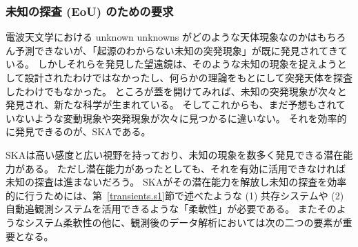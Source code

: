 \subsubsection{未知の探査 (EoU) のための要求}
電波天文学における unknown unknowns がどのような天体現象なのかはもちろん予測できないが、「起源のわからない未知の突発現象」が既に発見されてきている。
しかしそれらを発見した望遠鏡は、そのような未知の現象を捉えようとして設計されたわけではなかったし、何らかの理論をもとにして突発天体を探査したわけでもなかった。
ところが蓋を開けてみれば、未知の突発現象が次々と発見され、新たな科学が生まれている。
そしてこれからも、まだ予想もされていないような変動現象や突発現象が次々に見つかるに違いない。
それを効率的に発見できるのが、SKAである。

SKAは高い感度と広い視野を持っており、未知の現象を数多く発見できる潜在能力がある。
ただし潜在能力があったとしても、それを有効に活用できなければ未知の探査は進まないだろう。
SKAがその潜在能力を解放し未知の探査を効率的に行うためには、第~\ref{transients.s1}節で述べたような (1) 共存システムや (2) 自動追観測システムを活用できるような「柔軟性」が必要である。
またそのようなシステム柔軟性の他に、観測後のデータ解析においては次の二つの要素が重要となる。

